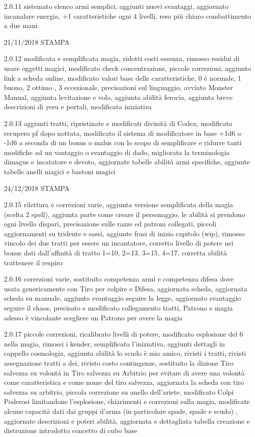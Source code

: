 \documentclass[a4paper,11pt,twoside,openany]{book}
\begin{document}
{{2.0.11 sistemato elenco armi semplici, aggiunti nuovi svantaggi, aggiornato incanalare energia, +1 caratteristiche ogni 4 livelli, reso più chiaro combattimento a due mani

21/11/2018 STAMPA

2.0.12 modificata e semplificata magia, ridotti costi essenza, rimosso residui di usare oggetti magici, modificato check concentrazione, piccole correzioni, aggiunto link a scheda online, modificato valori base delle caratteristiche, 0 è normale, 1 buono, 2 ottimo , 3 eccezionale, precisazioni sul linguaggio, avviato Monster Manual, aggiunta levitazione e volo, aggiunta abilità ferocia, aggiunta breve descrizioni di yeru e portali, modificata iniziativa

2.0.13 aggiunti tratti, ripristinate e modificati divinità di Codex, modificato recupero pf dopo nottata, modificato il sistema di modificatore in base +1d6 o -1d6 a seconda di un bonus o malus con lo scopo di semplificare e ridurre tanti modifiche ad un vantaggio o svantaggio di dado, migliorata la terminologia dimagus e incatatore e devoto, aggiornate tabelle abilità armi specifiche, aggiunte tabelle anelli magici e bastoni magici

24/12/2018 STAMPA

2.0.15 rilettura e correzioni varie, aggiunta versione semplificata della magia (scelta 2 spell), aggiunta parte come creare il personaggio, le abilità si prendono ogni livello dispari, precisazione sulle razze ed patroni collegati, piccoli aggiornamenti su tridente e sassi, aggiunte frasi di inizio capitolo (wip), rimosso vincolo dei due tratti per essere un incantatore, corretto livello di potere nei bonus dati dall'affinità di tratto 1=10, 2=13, 3=15, 4=17, corretta abilità trattenere il respiro

2.0.16 correzioni varie, sostituito competenza armi e competenza difesa dove usata genericamente con Tiro per colpire e Difesa, aggiornata scheda, aggiornata scheda su manuale, aggiunto svantaggio seguire la legge, aggiornato svantaggio seguire il chaos, precisato e modificato collegamento tratti, Patrono e magia adesso è vincolante scegliere un Patrono per avere la magia

2.0.17 piccole correzioni, ricalibrato livelli di potere, modificato esplosione del 6 nella magia, rimossi i kender, semplificata l'iniziativa, aggiunti dettagli in cappello cosmologia, aggiunta abilità lo scudo è mio amico, rivisti i tratti, rivisti assegnazione tratti a dei, rivisto costo contingenze, sostituito la dizione Tiro salvezza su volontà in Tiro salvezza su Arbitrio per evitare di avere una volontà come caratteristica e come nome del tiro salvezza, aggiornata la scheda con tiro salvezza su arbitrio, piccola correzione su anello dell'ariete, modificato Colpi Poderosi limitandone l'esplosione, chiarimenti e correzioni sulla magia, modificate alcune capacità dati dai gruppi d'arma (in particolare spade, spade e scudo) , aggiornate descrizioni e poteri abilità, aggiornata e dettagliata tabella creazione e distruzione introdotto concetto di cubo base

}}
\end{document}
